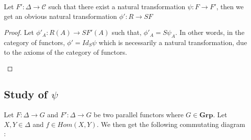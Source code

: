 \documentclass{report}
\begin{document}
\begin{prop}
    Let $F' : \Delta \rightarrow \mathcal{C}$ such that there exist a natural transformation $\psi : F \rightarrow F'$, then we get an obvious natural transformation $\phi' : R \rightarrow SF$
\end{prop}
\begin{proof}
    Let $\phi'_A : R(A) \rightarrow SF'(A)$ such that, $\phi'_A = S\psi_A$. In other words, in the category of functors, $\phi' = Id_S\psi$ which is necessarily a natural transformation, due to the axioms of the category of functors.
    \begin{figure}[ht]
        \centering
    \end{figure}

\end{proof}

\subsection{Study of $\psi$}

Let $F:\Delta\rightarrow G$ and $F':\Delta\rightarrow G$ be two parallel functors where $G\in \textbf{Grp}$. Let $X,Y\in\Delta$ and $f\in Hom(X,Y)$. We then get the following commutating diagram :

\begin{figure}[ht]
    \centering
\end{figure}
\end{document}
